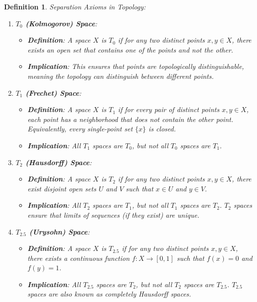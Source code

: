 \documentclass{article}
\newtheorem{definition}{Definition}[subsection]
\theoremstyle{definition}
\begin{document}
\begin{definition} Separation Axioms in Topology:\\

    \begin{enumerate}
    \item \textbf{\(T_0\) (Kolmogorov) Space}:
    \begin{itemize}
        \item \textbf{Definition}: A space \(X\) is \(T_0\) if for any two distinct points \(x, y \in X\), there exists an open set that contains one of the points and not the other.
        \item \textbf{Implication}: This ensures that points are topologically distinguishable, meaning the topology can distinguish between different points.
    \end{itemize}

    \item \textbf{\(T_1\) (Frechet) Space}:
    \begin{itemize}
        \item \textbf{Definition}: A space \(X\) is \(T_1\) if for every pair of distinct points \(x, y \in X\), each point has a neighborhood that does not contain the other point. Equivalently, every single-point set \(\{x\}\) is closed.
        \item \textbf{Implication}: All \(T_1\) spaces are \(T_0\), but not all \(T_0\) spaces are \(T_1\).
    \end{itemize}

    \item \textbf{\(T_2\) (Hausdorff) Space}:
    \begin{itemize}
        \item \textbf{Definition}: A space \(X\) is \(T_2\) if for any two distinct points \(x, y \in X\), there exist disjoint open sets \(U\) and \(V\) such that \(x \in U\) and \(y \in V\).
        \item \textbf{Implication}: All \(T_2\) spaces are \(T_1\), but not all \(T_1\) spaces are \(T_2\). \(T_2\) spaces ensure that limits of sequences (if they exist) are unique.
    \end{itemize}

    \item \textbf{\(T_{2.5}\) (Urysohn) Space}:
    \begin{itemize}
        \item \textbf{Definition}: A space \(X\) is \(T_{2.5}\) if for any two distinct points \(x, y \in X\), there exists a continuous function \(f: X \to [0, 1]\) such that \(f(x) = 0\) and \(f(y) = 1\).
        \item \textbf{Implication}: All \(T_{2.5}\) spaces are \(T_2\), but not all \(T_2\) spaces are \(T_{2.5}\). \(T_{2.5}\) spaces are also known as completely Hausdorff spaces.
    \end{itemize}


\end{enumerate}
\end{definition}
\end{document}
